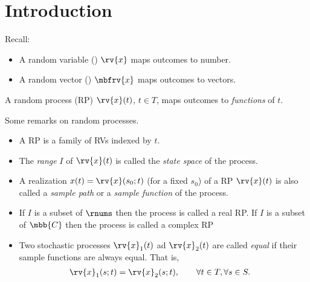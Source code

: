 \section{Introduction}
Recall: 
\begin{itemize}
    \item A random variable () $\rv{x}$ maps outcomes to number.
    \item A random vector () $\mbfrv{x}$ maps outcomes to vectors.
\end{itemize}
\begin{definitionBox}
    \label{def:random process}
    A random process (RP) $\rv{x}(t)$, $t\in T$, maps outcomes to \emph{functions} of $t$.
\end{definitionBox}
\begin{myremark}
    Some remarks on random processes. 
    \begin{itemize}
        \item A RP is a family of RVs indexed by $t$.
        \item The \emph{range} $I$ of $\rv{x}(t)$ is called the \emph{state space} of the process.
        \item A realization $x(t) = \rv{x}(s_{0}; t)$ (for a fixed $s_{0}$) of a RP $\rv{x}(t)$ is also called a \emph{sample path} or a \emph{sample function} of the process.
        \item If $I$ is a subset of $\rnums$ then the process is called a real RP. If $I$ is a subset of $\mbb{C}$ then the process is called a complex RP
        \item Two stochastic processes $\rv{x}_{1}(t)$ ad $\rv{x}_{2}(t)$ are called \emph{equal} if their sample functions are always equal. That is,
        \begin{align}
            \rv{x}_{1}(s; t) &= \rv{x}_{2}(s; t), \qquad \forall t\in T, \forall s\in S.
        \end{align}
    \end{itemize}
\end{myremark}

